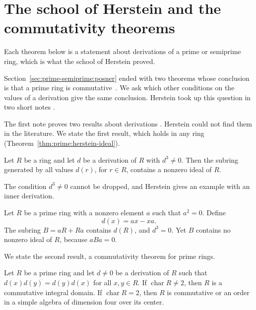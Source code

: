 \section{The school of Herstein and the commutativity theorems}\label{sec:prime-semiprime:herstein-school}

Each theorem below is a statement about derivations of a prime or semiprime
ring, which is what the school of Herstein proved.

Section~\ref{sec:prime-semiprime:posner} ended with two theorems whose
conclusion is that a prime ring is commutative~\cite{Herstein1978,Herstein1979}. We ask which other conditions
on the values of a derivation give the same conclusion. Herstein took up this
question in two short notes \cite{Herstein1978,Herstein1979}.

The first note proves two results about derivations
\cite[p.~369]{Herstein1978}. Herstein could not find them in the literature.
We state the first result, which holds in any ring
(Theorem~\ref{thm:prime:herstein-ideal}).

\begin{theorem}\label{thm:prime:herstein-ideal}
Let $R$ be a ring and let $d$ be a derivation of $R$ with $d^3\neq 0$. Then the
subring generated by all values $d(r)$, for $r\in R$, contains a nonzero ideal
of $R$.
\end{theorem}

The condition $d^3\neq 0$ cannot be dropped, and Herstein gives an example
with an inner derivation.

\begin{example}\label{ex:prime:herstein-cube}
Let $R$ be a prime ring with a nonzero element $a$ such that $a^2=0$. Define
\[
d(x)=ax-xa .
\]
The subring $B=aR+Ra$ contains $d(R)$, and $d^3=0$. Yet $B$ contains no nonzero
ideal of $R$, because $aBa=0$.
\end{example}

We state the second result, a commutativity theorem for prime rings.

\begin{theorem}\label{thm:prime:herstein-commuting}
Let $R$ be a prime ring and let $d\neq 0$ be a derivation of $R$ such that
$d(x)d(y)=d(y)d(x)$ for all $x,y\in R$. If $\operatorname{char}R\neq 2$, then
$R$ is a commutative integral domain. If $\operatorname{char}R=2$, then $R$ is
commutative or an order in a simple algebra of dimension four over its center.
\end{theorem}

